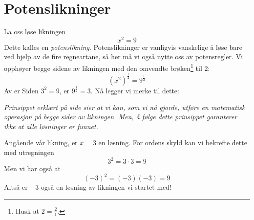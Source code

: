 \newpage
{}
\section{Potenslikninger}
La oss løse likningen
\[ x^2=9 \]
Dette kalles en \textit{potenslikning}. Potenslikninger er vanligvis vanskelige å løse bare ved hjelp av de fire regneartane, så her må vi også nytte oss av potensregler. Vi opphøyer begge sidene av likningen med den omvendte brøken\footnote{Husk at $ 2=\frac{2}{1} $.} til 2:
\[ \left(x^2\right)^\frac{1}{2}=9^\frac{1}{2} \]
Av  er
Siden $ 3^2=9 $, er $ 9^\frac{1}{2}=3 $. Nå legger vi merke til dette: \vsk

\textit{Prinsippet erklært på side \pageref{principle} sier at vi kan, som vi nå gjorde, utføre en matematisk operasjon på begge sider av likningen. Men, å følge dette prinsippet garanterer ikke at alle løsninger er funnet.} \\ \vsk

Angående vår likning, er $ {x=3} $ en løsning. For ordens skyld kan vi bekrefte dette med utregningen
\[ 3^2=3\cdot3=9 \]
Men vi har også at
\[ (-3)^2=(-3)(-3)=9 \]
Altså er $ -3 $ også en løsning av likningen vi startet med! \regv

